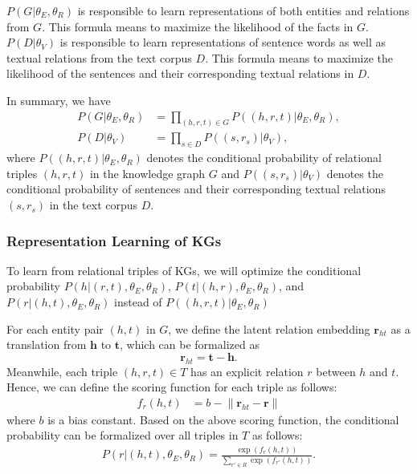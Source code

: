 \documentclass[letterpaper]{article} %
\begin{document}
$P(G|\theta_E, \theta_R)$ is responsible to learn representations of both entities and relations from $G$. This formula means to maximize the likelihood of the facts in $G$. $P(D|{\theta_V})$ is responsible to learn representations of sentence words as well as textual relations from the text corpus $D$. This formula means to maximize the likelihood of the sentences and their corresponding textual relations in $D$. 

In summary, we have
\begin{align}
 P(G|{\theta_E,\theta_R}) & = \prod_{(h,r,t) \in G}P((h, r, t)|{\theta_E, \theta_R}), \\
 P(D|{\theta_V}) & = \prod_{s \in D}P((s, r_s)|{\theta_V}),
\end{align}
where $P((h, r, t)|{\theta_E,\theta_R})$ denotes the conditional probability of relational triples $(h, r, t)$ in the knowledge graph $G$ and $P((s, r_s)|{\theta_V})$ denotes the conditional probability of sentences and their corresponding textual relations $(s, r_s)$ in the text corpus $D$.


\subsubsection{Representation Learning of KGs}
\label{sec:kg}

To learn from relational triples of KGs, we will optimize the conditional probability $P(h|(r, t),{\theta_E, \theta_R})$, $P(t|(h, r),{\theta_E, \theta_R})$, and $P(r|(h, t),{\theta_E, \theta_R})$ instead of $P((h, r, t)|{\theta_E, \theta_R})$

For each entity pair $(h, t)$ in $G$, we define the latent relation embedding $\mathbf{r}_{ht}$ as a translation from $\mathbf{h}$ to $\mathbf{t}$, which can be formalized as
\begin{equation}
\textbf{r}_{ht} = \textbf{t} - \textbf{h}.
\end{equation}
Meanwhile, each triple $(h, r, t) \in T$ has an explicit relation $r$ between $h$ and $t$. Hence, we can define the scoring function for each triple as follows:
\begin{align}
\label{eq:kg_distance}
f_r(h, t) & = b - \lVert \textbf{r}_{ht} - \textbf{r} \rVert  
\end{align}
where $b$ is a bias constant. Based on the above scoring function, the conditional probability can be formalized over all triples in $T$ as follows:
\begin{align}
P(r|(h, t),{\theta_E, \theta_R}) = \frac{\exp(f_r(h, t))}{\sum_{{r'} \in R} \exp(f_{r'}(h, t))}.
\end{align}
\end{document}
